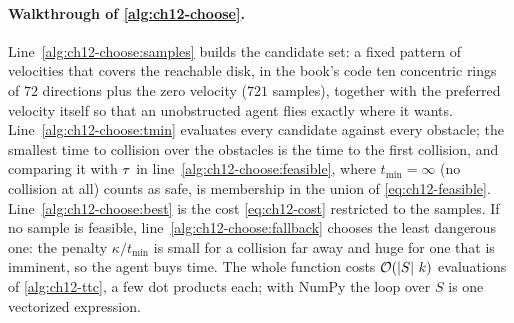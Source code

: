 \paragraph{Walkthrough of \cref{alg:ch12-choose}.}
Line~\ref{alg:ch12-choose:samples} builds the candidate set: a fixed pattern of
velocities that covers the reachable disk, in the book's code ten concentric
rings of $72$ directions plus the zero velocity ($721$ samples), together with
the preferred velocity itself so that an unobstructed agent flies exactly
where it wants. Line~\ref{alg:ch12-choose:tmin} evaluates every candidate
against every obstacle; the smallest time to collision over the obstacles is
the time to the first collision, and comparing it with $\tau$ in
line~\ref{alg:ch12-choose:feasible}, where $t_{\min} = \infty$ (no collision
at all) counts as safe, is membership in the union of
\cref{eq:ch12-feasible}. Line~\ref{alg:ch12-choose:best} is the cost
\cref{eq:ch12-cost} restricted to the samples. If no sample is feasible,
line~\ref{alg:ch12-choose:fallback} chooses the least dangerous one: the
penalty $\kappa/t_{\min}$ is small for a collision far away and huge for one
that is imminent, so the agent buys time. The whole function costs
$\mathcal{O}\!\left(\left\lvert S \right\rvert\,k\right)$ evaluations of \cref{alg:ch12-ttc}, a few dot products
each; with NumPy the loop over $S$ is one vectorized expression.

\begin{algorithm}[htb]
\caption{Synchronous velocity-obstacle simulation}
\label{alg:ch12-simulate}
\end{algorithm}

